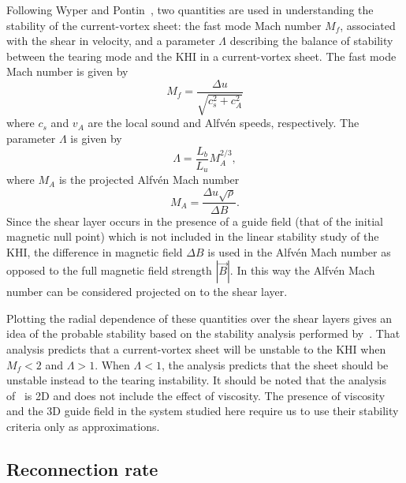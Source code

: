\label{sec:stability_measures}

Following Wyper and Pontin~\cite{wyperKelvinHelmholtzInstabilityCurrentvortex2013}, two quantities are used in understanding the stability of the current-vortex sheet: the fast mode Mach number $M_f$, associated with the shear in velocity, and a parameter $\Lambda$ describing the balance of stability between the tearing mode and the KHI in a current-vortex sheet. The fast mode Mach number is given by
\begin{equation}
  \label{eq:mach_numbers}
  M_f = \frac{\Delta u}{\sqrt{c_s^2 + c_A^2}}
\end{equation}
where $c_s$ and $v_A$ are the local sound and Alfv\'en speeds, respectively. The parameter $\Lambda$ is given by
\begin{equation}
  \label{eq:khi_stability_param}
  \Lambda = \frac{L_b}{L_u} M_A^{2/3},
\end{equation}
where $M_A$ is the projected Alfv\'en Mach number
\begin{equation}
  \label{eq:alfven_mach_number}
M_A = \frac{\Delta u \sqrt{\rho}}{\Delta B}.
\end{equation}
Since the shear layer occurs in the presence of a guide field (that of the initial magnetic null point) which is not included in the linear stability study of the KHI, the difference in magnetic field $\Delta B$ is used in the Alfv\'en Mach number as opposed to the full magnetic field strength $|\vec{B}|$. In this way the Alfv\'en Mach number can be considered projected on to the shear layer. 

Plotting the radial dependence of these quantities over the shear layers gives an idea of the probable stability based on the stability analysis performed by~\cite{einaudiResistiveInstabilitiesFlowing1986}. That analysis predicts that a current-vortex sheet will be unstable to the KHI when $M_f < 2$ and $\Lambda > 1$. When $\Lambda < 1$, the analysis predicts that the sheet should be unstable instead to the tearing instability. It should be noted that the analysis of~\cite{einaudiResistiveInstabilitiesFlowing1986} is 2D and does not include the effect of viscosity. The presence of viscosity and the 3D guide field in the system studied here require us to use their stability criteria only as approximations.

\subsection{Reconnection rate}

